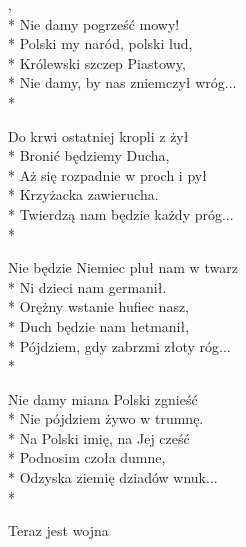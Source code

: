 \begin{lyrics}[longestline={Nie będzie Niemiec pluł nam w twarz}]

,\\*
Nie damy pogrześć mowy!\\*
Polski my naród, polski lud,\\*
Królewski szczep Piastowy,\\*
Nie damy, by nas zniemczył wróg...\\*

Do krwi ostatniej kropli z żył\\*
Bronić będziemy Ducha,\\*
Aż się rozpadnie w proch i pył\\*
Krzyżacka zawierucha.\\*
Twierdzą nam będzie każdy próg...\\*

Nie będzie Niemiec pluł nam w twarz\\*
Ni dzieci nam germanił.\\*
Orężny wstanie hufiec nasz,\\*
Duch będzie nam hetmanił,\\*
Pójdziem, gdy zabrzmi złoty róg...\\*

Nie damy miana Polski zgnieść\\*
Nie pójdziem żywo w trumnę.\\*
Na Polski imię, na Jej cześć\\*
Podnosim czoła dumne,\\*
Odzyska ziemię dziadów wnuk...\\*
\end{lyrics}



\song
{Teraz jest wojna}


